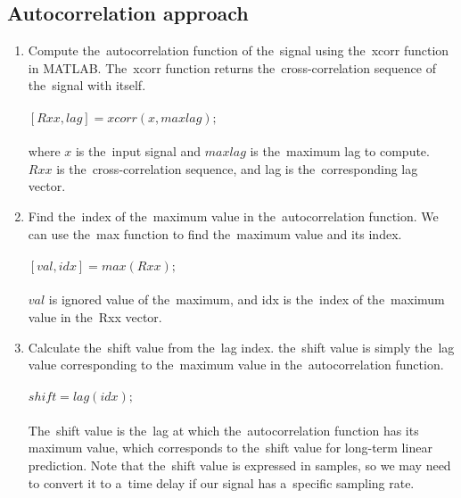        \subsection{Autocorrelation approach} \label{subsec:acorr}
        \begin{enumerate}
            \item Compute the~autocorrelation function of the~signal using the~xcorr function in MATLAB.
           The~xcorr function returns the~cross-correlation sequence of the~signal with itself.\\
            \\
            $[Rxx, lag] = xcorr(x, maxlag);$\\
            \\
            where $x$ is the~input signal and $maxlag$ is the~maximum lag to compute. $Rxx$ is the~cross-correlation
            sequence, and lag is the~corresponding lag vector.
            \item Find the~index of the~maximum value in the~autocorrelation function. We can use the~max function to
            find the~maximum value and its index.\\
            \\
            $[val, idx] = max(Rxx);$\\
            \\
            $val$ is ignored value of the~maximum, and idx is the~index of the~maximum value in the~Rxx vector.
            \item Calculate the~shift value from the~lag index. the~shift value is simply the~lag value
            corresponding to the~maximum value in the~autocorrelation function.\\
            \\
            $shift = lag(idx);$\\
            \\
           The~shift value is the~lag at which the~autocorrelation function has its maximum value, which
            corresponds to the~shift value for long-term linear prediction. Note that the~shift value is expressed in
            samples, so we may need to convert it to a~time delay if our signal has a~specific sampling rate.
        \end{enumerate}
        \newpage
